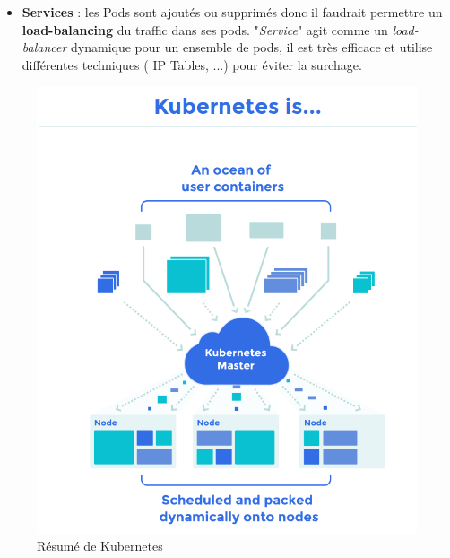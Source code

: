 \begin{onehalfspace}
\begin{itemize}
\item \textbf{Services} : les Pods sont ajoutés ou supprimés donc il faudrait permettre un \textbf{load-balancing} du traffic dans ses pods. "\emph{Service}" agit comme un \emph{load-balancer} dynamique pour un ensemble de pods, il est très efficace et utilise différentes techniques ( IP Tables, ...) pour éviter la surchage.

\end{itemize}
\begin{figure}[H]
\centering
\includegraphics [scale=0.5]{chapitre3/assets/kuber.png}
\caption{Résumé de Kubernetes}
\end{figure}

 

\end{onehalfspace}